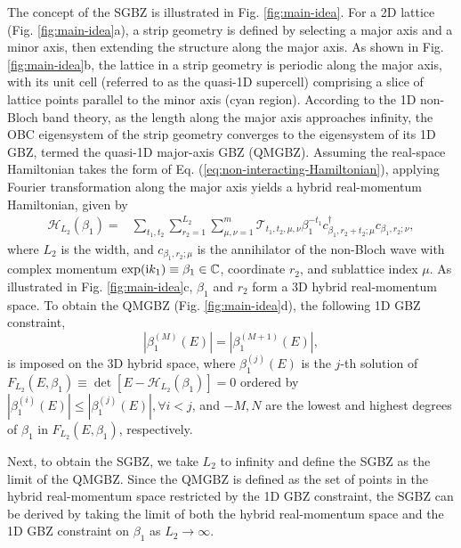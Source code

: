 \documentclass[pdflatex,sn-nature, iicol]{sn-jnl}%
\theoremstyle{thmstyleone}%
\theoremstyle{thmstyletwo}%
\theoremstyle{thmstylethree}%
\begin{document}
The concept of the SGBZ is illustrated in Fig. \ref{fig:main-idea}.
For a 2D lattice (Fig. \ref{fig:main-idea}a), a strip geometry is
defined by selecting a major axis and a minor axis, then extending
the structure along the major axis. As shown in Fig. \ref{fig:main-idea}b,
the lattice in a strip geometry is periodic along the major axis,
with its unit cell (referred to as the quasi-1D supercell) comprising
a slice of lattice points parallel to the minor axis (cyan region).
According to the 1D non-Bloch band theory, as the length along the
major axis approaches infinity, the OBC eigensystem of the strip geometry
converges to the eigensystem of its 1D GBZ, termed the quasi-1D major-axis
GBZ (QMGBZ). Assuming the real-space Hamiltonian takes the form of
Eq. (\ref{eq:non-interacting-Hamiltonian}), applying Fourier transformation
along the major axis yields a hybrid real-momentum Hamiltonian, given
by 
\begin{align}
\mathcal{H}_{L_{2}}\left(\beta_{1}\right)= & \sum_{t_{1},t_{2}}\sum_{r_{2}=1}^{L_{2}}\sum_{\mu,\nu=1}^{m}\mathcal{T}_{t_{1},t_{2},\mu,\nu}\beta_{1}^{-t_{1}}c_{\beta_{1},r_{2}+t_{2};\mu}^{\dagger}c_{\beta_{1},r_{2};\nu},\label{eq:hybrid-non-Bloch-Hamiltonian}
\end{align}
where $L_{2}$ is the width, and $c_{\beta_{1},r_{2};\mu}$ is the
annihilator of the non-Bloch wave with complex momentum $\exp(\mathrm{i} k_{1})\equiv\beta_{1}\in\mathbb{C}$,
coordinate $r_{2}$, and sublattice index $\mu$. As illustrated in
Fig. \ref{fig:main-idea}c, $\beta_{1}$ and $r_{2}$ form a 3D hybrid
real-momentum space. To obtain the QMGBZ (Fig. \ref{fig:main-idea}d),
the following 1D GBZ constraint, 
\begin{equation}
|\beta_{1}^{(M)}(E)|=|\beta_{1}^{(M+1)}(E)|,\label{eq:quasi-1D-GBZ-constraint}
\end{equation}
is imposed on the 3D hybrid space, where $\beta_{1}^{(j)}(E)$ is
the $j$-th solution of $F_{L_{2}}(E,\beta_{1})\equiv\det[E-\mathcal{H}_{L_{2}}(\beta_{1})]=0$
ordered by $|\beta_{1}^{(i)}(E)|\leq|\beta_{1}^{(j)}(E)|,\forall i<j$,
and $-M,N$ are the lowest and highest degrees of $\beta_{1}$ in
$F_{L_{2}}(E,\beta_{1})$, respectively.

Next, to obtain the SGBZ, we take $L_{2}$ to infinity and define
the SGBZ as the limit of the QMGBZ. Since the QMGBZ is defined as
the set of points in the hybrid real-momentum space restricted by
the 1D GBZ constraint, the SGBZ can be derived by taking the limit
of both the hybrid real-momentum space and the 1D GBZ constraint on
$\beta_{1}$ as $L_{2}\rightarrow\infty$.
\end{document}
